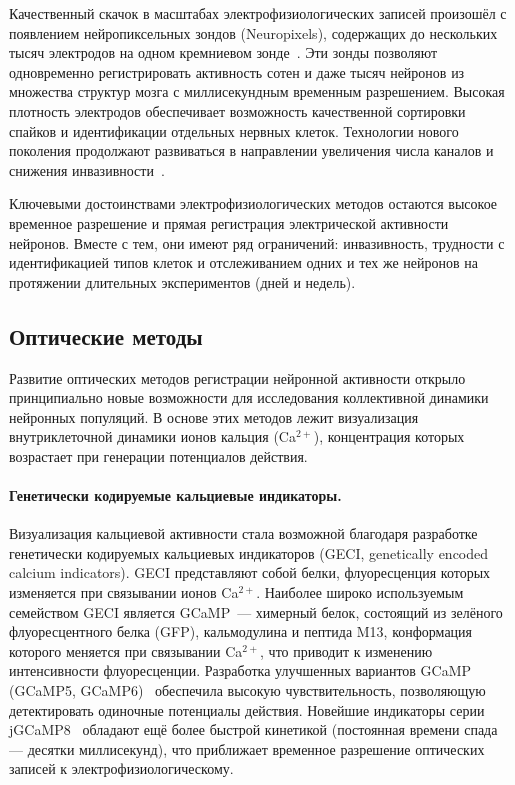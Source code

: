 Качественный скачок в масштабах электрофизиологических записей произошёл с появлением нейропиксельных зондов (Neuropixels), содержащих до нескольких тысяч электродов на одном кремниевом зонде~\cite{Hong2019}. Эти зонды позволяют одновременно регистрировать активность сотен и даже тысяч нейронов из множества структур мозга с миллисекундным временным разрешением. Высокая плотность электродов обеспечивает возможность качественной сортировки спайков и идентификации отдельных нервных клеток. Технологии нового поколения продолжают развиваться в направлении увеличения числа каналов и снижения инвазивности~\cite{Hong2019}.

Ключевыми достоинствами электрофизиологических методов остаются высокое временное разрешение и прямая регистрация электрической активности нейронов. Вместе с тем, они имеют ряд ограничений: инвазивность, трудности с идентификацией типов клеток и отслеживанием одних и тех же нейронов на протяжении длительных экспериментов (дней и недель).

\subsection{Оптические методы}
\label{sec:optical_methods}

Развитие оптических методов регистрации нейронной активности открыло принципиально новые возможности для исследования коллективной динамики нейронных популяций. В основе этих методов лежит визуализация внутриклеточной динамики ионов кальция (Ca$^{2+}$), концентрация которых возрастает при генерации потенциалов действия.

\paragraph{Генетически кодируемые кальциевые индикаторы.}
Визуализация кальциевой активности стала возможной благодаря разработке генетически кодируемых кальциевых индикаторов (GECI, genetically encoded calcium indicators). GECI представляют собой белки, флуоресценция которых изменяется при связывании ионов Ca$^{2+}$. Наиболее широко используемым семейством GECI является GCaMP~--- химерный белок, состоящий из зелёного флуоресцентного белка (GFP), кальмодулина и пептида M13, конформация которого меняется при связывании Ca$^{2+}$, что приводит к изменению интенсивности флуоресценции. Разработка улучшенных вариантов GCaMP (GCaMP5, GCaMP6)~\cite{Chen2013} обеспечила высокую чувствительность, позволяющую детектировать одиночные потенциалы действия. Новейшие индикаторы серии jGCaMP8~\cite{Zhang2023} обладают ещё более быстрой кинетикой (постоянная времени спада --- десятки миллисекунд), что приближает временное разрешение оптических записей к электрофизиологическому.

